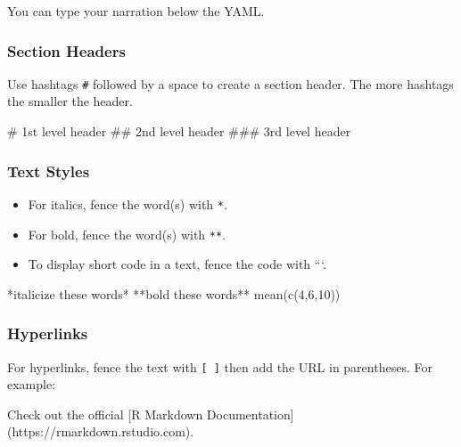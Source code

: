 \documentclass[
]{book}
\newenvironment{Shaded}{\begin{snugshade}}{\end{snugshade}}
\newcommand{\NormalTok}[1]{#1}
\providecommand{\tightlist}{%
  \setlength{\itemsep}{0pt}\setlength{\parskip}{0pt}}
\theoremstyle{definition}
\theoremstyle{definition}
\theoremstyle{definition}
\theoremstyle{definition}
\theoremstyle{remark}
\begin{document}
You can type your narration below the YAML.

\hypertarget{section-headers}{%
\subsubsection{Section Headers}\label{section-headers}}

Use hashtags \texttt{\#} followed by a space to create a section header. The more hashtags the smaller the header.

\begin{Shaded}
\begin{Highlighting}[]
\NormalTok{\# 1st level header}
\NormalTok{\#\# 2nd level header}
\NormalTok{\#\#\# 3rd level header}
\end{Highlighting}
\end{Shaded}

\hypertarget{text-styles}{%
\subsubsection{Text Styles}\label{text-styles}}

\begin{itemize}
\tightlist
\item
  For italics, fence the word(s) with \texttt{*}.
\item
  For bold, fence the word(s) with \texttt{**}.
\item
  To display short code in a text, fence the code with ```.
\end{itemize}

\begin{Shaded}
\begin{Highlighting}[]
\NormalTok{*italicize these words*}
\NormalTok{**bold these words**}
\NormalTok{\textasciigrave{}mean(c(4,6,10))\textasciigrave{}}
\end{Highlighting}
\end{Shaded}

\hypertarget{hyperlinks}{%
\subsubsection{Hyperlinks}\label{hyperlinks}}

For hyperlinks, fence the text with \texttt{{[}\ {]}} then add the URL in parentheses. For example:

\begin{Shaded}
\begin{Highlighting}[]
\NormalTok{Check out the official [R Markdown Documentation](https://rmarkdown.rstudio.com).}
\end{Highlighting}
\end{Shaded}
\end{document}
